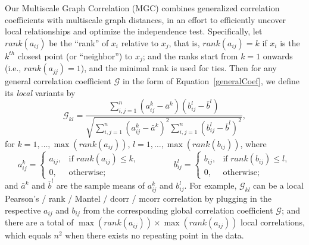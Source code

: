 \documentclass[11pt]{article}
\newcommand{\G}{\mathcal{G}}
\begin{document}
Our Multiscale Graph Correlation (MGC) combines generalized correlation coefficients with multiscale graph distances, in an effort to efficiently uncover local relationships and optimize the independence test.  Specifically, let $rank(a_{ij})$  be the ``rank'' of $x_i$ relative to $x_j$, that is, $rank(a_{ij})=k$ if $x_i$ is the $k^{th}$ closest point (or ``neighbor'') to $x_j$; and the ranks start from $k=1$ onwards (i.e., $rank(a_{jj})=1$), and the minimal rank is used for ties.  Then for any general correlation coefficient $\G$ in the form of Equation~\ref{generalCoef}, we define its \emph{local} variants by
\begin{equation}
\label{localCoef}
\G_{kl}=\frac{\sum_{i,j=1}^n (a_{ij}^k-\bar{a}^{k}) (b_{ij}^l-\bar{b}^{l})}{\sqrt{\sum_{i,j=1}^n  (a_{ij}^{k}-\bar{a}^{k})^2 \sum_{i,j=1}^n (b_{ij}^{l}-\bar{b}^{l})^2}},
\end{equation}
for $k=1,\ldots,\max(rank(a_{ij}))$, $l=1,\ldots,\max(rank(b_{ij}))$, where
\begin{equation}
\label{localCoef2}
    a_{ij}^k=
    \begin{cases}
      a_{ij}, & \text{if } rank(a_{ij}) \leq k, \\
      0, & \text{otherwise};
    \end{cases} \qquad \qquad
    b_{ij}^l=
    \begin{cases}
      b_{ij}, & \text{if } rank(b_{ij}) \leq l, \\
      0, & \text{otherwise};
    \end{cases}
\end{equation}
and $\bar{a}^{k}$ and $\bar{b}^{l}$ are the sample means of $a_{ij}^{k}$ and $b_{ij}^{l}$. For example, $\G_{kl}$ can be a local Pearson's / rank / Mantel / dcorr / mcorr correlation by plugging in the respective $a_{ij}$ and $b_{ij}$ from the corresponding global correlation coefficient $\G$; and there are a total of $\max(rank(a_{ij})) \times \max(rank(a_{ij}))$ local correlations, which equals $n^2$ when there exists no repeating point in the data.
\end{document}
